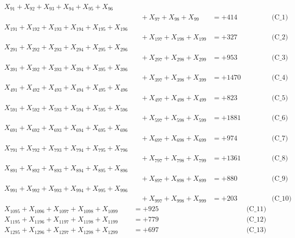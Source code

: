 \documentclass[a4paper,10pt]{article}
\begin{document}
\allowdisplaybreaks
{\small
\begin{align}
X_{91} + X_{92} + X_{93} + X_{94} + X_{95} + X_{96} \\[0.1ex]
&\quad  + X_{97} + X_{98} + X_{99} &= +414 && \text{(C\_1)} \\
X_{191} + X_{192} + X_{193} + X_{194} + X_{195} + X_{196} \\[0.1ex]
&\quad  + X_{197} + X_{198} + X_{199} &= +327 && \text{(C\_2)} \\
X_{291} + X_{292} + X_{293} + X_{294} + X_{295} + X_{296} \\[0.1ex]
&\quad  + X_{297} + X_{298} + X_{299} &= +953 && \text{(C\_3)} \\
X_{391} + X_{392} + X_{393} + X_{394} + X_{395} + X_{396} \\[0.1ex]
&\quad  + X_{397} + X_{398} + X_{399} &= +1470 && \text{(C\_4)} \\
X_{491} + X_{492} + X_{493} + X_{494} + X_{495} + X_{496} \\[0.1ex]
&\quad  + X_{497} + X_{498} + X_{499} &= +823 && \text{(C\_5)} \\
\allowbreak
X_{591} + X_{592} + X_{593} + X_{594} + X_{595} + X_{596} \\[0.1ex]
&\quad  + X_{597} + X_{598} + X_{599} &= +1881 && \text{(C\_6)} \\
X_{691} + X_{692} + X_{693} + X_{694} + X_{695} + X_{696} \\[0.1ex]
&\quad  + X_{697} + X_{698} + X_{699} &= +974 && \text{(C\_7)} \\
X_{791} + X_{792} + X_{793} + X_{794} + X_{795} + X_{796} \\[0.1ex]
&\quad  + X_{797} + X_{798} + X_{799} &= +1361 && \text{(C\_8)} \\
X_{891} + X_{892} + X_{893} + X_{894} + X_{895} + X_{896} \\[0.1ex]
&\quad  + X_{897} + X_{898} + X_{899} &= +880 && \text{(C\_9)} \\
X_{991} + X_{992} + X_{993} + X_{994} + X_{995} + X_{996} \\[0.1ex]
&\quad  + X_{997} + X_{998} + X_{999} &= +203 && \text{(C\_10)} \\
\allowbreak
X_{1095} + X_{1096} + X_{1097} + X_{1098} + X_{1099} &= +925 && \text{(C\_11)} \\
X_{1195} + X_{1196} + X_{1197} + X_{1198} + X_{1199} &= +779 && \text{(C\_12)} \\
X_{1295} + X_{1296} + X_{1297} + X_{1298} + X_{1299} &= +697 && \text{(C\_13)} \\

\end{align}}
\end{document}
